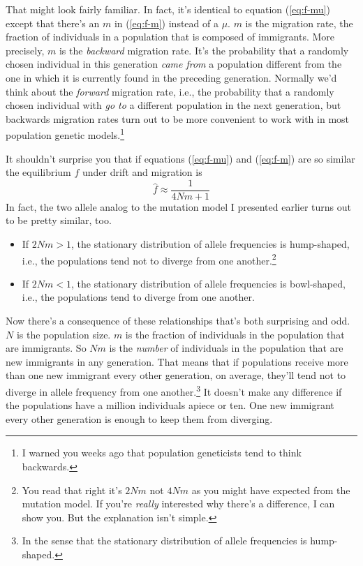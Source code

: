 \documentclass[12pt]{article}
\begin{document}
That might look fairly familiar. In fact, it's identical to equation
(\ref{eq:f-mu}) except that there's an $m$ in (\ref{eq:f-m}) instead
of a $\mu$. $m$ is the migration rate, the fraction of individuals in
a population that is composed of immigrants. More precisely, $m$ is
the {\it backward\/} migration rate.
It's the probability that a randomly chosen individual in this
generation {\it came from\/} a population different from the one in
which it is currently found in the preceding generation. Normally we'd
think about the {\it forward\/} migration rate,  i.e., the probability
that a randomly chosen individual with {\it go to\/} a different
population in the next generation, but backwards migration rates turn
out to be more convenient to work with in most population genetic
models.\footnote{I warned you weeks ago that population geneticists
  tend to think backwards.}

It shouldn't surprise you that if equations (\ref{eq:f-mu}) and
(\ref{eq:f-m}) are so similar the equilibrium $f$ under drift and
migration is
\[
\hat f \approx \frac{1}{4Nm + 1}
\]
In fact, the two allele analog to the mutation model I presented
earlier turns out to be pretty similar, too.

\begin{itemize}

\item If $2Nm > 1$, the stationary distribution of allele frequencies
is hump-shaped, i.e., the populations tend not to diverge from one
another.\footnote{You read that right it's $2Nm$ not $4Nm$ as you
might have expected from the mutation model. If you're {\it really\/}
interested why there's a difference, I can show you. But the
explanation isn't simple.}

\item If $2Nm < 1$, the stationary distribution of allele frequencies
is bowl-shaped, i.e., the populations tend to diverge from one another.

\end{itemize}

Now there's a consequence of these relationships that's both
surprising and odd. $N$ is the population size. $m$ is the fraction of
individuals in the population that are immigrants. So $Nm$ is the {\it
  number\/} of individuals in the population that are new immigrants
in any generation. That means that if populations receive more than
one new immigrant every other generation, on average, they'll tend not
to diverge in allele frequency from one another.\footnote{In the sense
  that the stationary distribution of allele frequencies is
  hump-shaped.} It doesn't make any difference if the populations have
a million individuals apiece or ten. One new immigrant every other
generation is enough to keep them from diverging.
\end{document}
